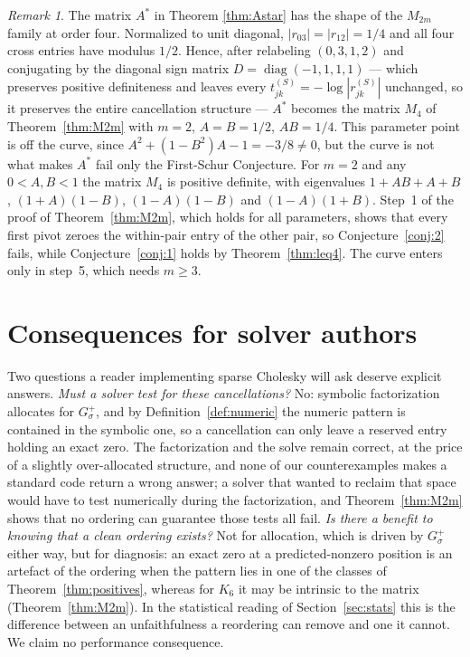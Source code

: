 \documentclass[11pt]{article}
\theoremstyle{plain}
\theoremstyle{definition}
\theoremstyle{remark}
\newtheorem{remark}[theorem]{Remark}
\begin{document}
\begin{humanaiblock}
\begin{remark}\label{rem:astar-family}
The matrix $A^*$ in Theorem \ref{thm:Astar} has the shape of the $M_{2m}$ family at order four. Normalized to unit diagonal, $|r_{03}|=|r_{12}|=1/4$ and all four cross entries have modulus $1/2$. Hence, after relabeling $(0,3,1,2)$ and conjugating by the diagonal sign matrix $D=\operatorname{diag}(-1,1,1,1)$ --- which preserves positive definiteness and leaves every $t^{(S)}_{jk}=-\log|r^{(S)}_{jk}|$ unchanged, so it preserves the entire cancellation structure --- $A^*$ becomes the matrix $M_4$ of Theorem~\ref{thm:M2m} with $m=2$, $A=B=1/2$, $AB=1/4$. This parameter point is off the curve, since $A^2+(1-B^2)A-1=-3/8\neq0$, but the curve is not what makes $A^*$ fail only the First-Schur Conjecture. For $m=2$ and any $0<A,B<1$ the matrix $M_4$ is positive definite, with eigenvalues $1+AB+A+B$, $(1+A)(1-B)$, $(1-A)(1-B)$ and $(1-A)(1+B)$. Step~1 of the proof of Theorem~\ref{thm:M2m}, which holds for all parameters, shows that every first pivot zeroes the within-pair entry of the other pair, so Conjecture~\ref{conj:2} fails, while Conjecture~\ref{conj:1} holds by Theorem~\ref{thm:leq4}. The curve enters only in step~5, which needs $m\ge3$.
\end{remark}
\end{humanaiblock}

\section{Consequences for solver authors}\label{sec:practical}
\begin{humanblock}
Two questions a reader implementing sparse Cholesky will ask deserve explicit answers. \emph{Must a
solver test for these cancellations?} No: symbolic factorization allocates for $G^+_\sigma$, and by
Definition~\ref{def:numeric} the numeric pattern is contained in the symbolic one, so a cancellation
can only leave a reserved entry holding an exact zero. The factorization and the solve remain correct,
at the price of a slightly over-allocated structure, and none of our counterexamples makes a standard
code return a wrong answer; a solver that wanted to reclaim that space would have to test numerically
during the factorization, and Theorem~\ref{thm:M2m} shows that no ordering can guarantee those tests
all fail. \emph{Is there a benefit to knowing that a clean ordering exists?} Not for allocation, which
is driven by $G^+_\sigma$ either way, but for diagnosis: an exact zero at a predicted-nonzero position
is an artefact of the ordering when the pattern lies in one of the classes of
Theorem~\ref{thm:positives}, whereas for $K_6$ it may be intrinsic to the matrix
(Theorem~\ref{thm:M2m}). In the statistical reading of Section~\ref{sec:stats} this is the difference
between an unfaithfulness a reordering can remove and one it cannot. We claim no performance
consequence.
\end{humanblock}
\end{document}
